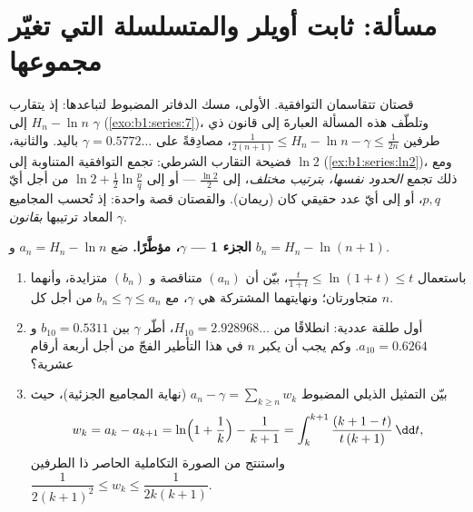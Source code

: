 \section{مسألة: ثابت أويلر والمتسلسلة التي تغيّر
مجموعها}

\begin{problem}[{مسألة نهاية الأسبوع --- $H_n = \ln n + \gamma +
\frac{1}{2n} + O(n^{-2})$، وإعادة ترتيب $1 - \frac12 +
\frac13 - \dots$ إلى $\frac{\ln 2}{2}$}]
\label{pb:b1:series:1}
قصتان تتقاسمان  التوافقية. الأولى، مسك الدفاتر
المضبوط لتباعدها: إذ يتقارب $H_n - \ln n$ إلى 
$\gamma$ (\cref{exo:b1:series:7})، وتلطّف هذه المسألة
العبارةَ إلى قانون ذي طرفين $\frac{1}{2(n+1)}
\leq H_n - \ln n - \gamma \leq \frac{1}{2n}$، مصادِقةً على $\gamma
= 0.5772\dots$ باليد. والثانية، فضيحة التقارب
الشرطي: تجمع  التوافقية المتناوبة إلى $\ln 2$
(\cref{ex:b1:series:ln2})، ومع ذلك تجمع \emph{الحدود نفسها، بترتيب
مختلف}، إلى $\frac{\ln 2}{2}$ --- أو إلى $\ln 2 +
\frac12\ln\frac pq$ من أجل أيّ $p, q$، أو إلى أيّ عدد حقيقي كان
(ريمان). والقصتان قصة واحدة: إذ تُحسب المجاميع المعاد ترتيبها
\emph{بقانون} $\gamma$.

\medskip
\noindent\textbf{الجزء 1 --- $\gamma$، مؤطَّرًا.} ضع $a_n = H_n
- \ln n$ و $b_n = H_n - \ln(n+1)$.
\begin{enumerate}
  \item باستعمال $\frac{t}{1+t} \leq \ln(1 + t) \leq t$، بيّن أن
        $(a_n)$ متناقصة و $(b_n)$ متزايدة، وأنهما
        متجاورتان؛ ونهايتهما المشتركة هي $\gamma$، مع $b_n \leq
        \gamma \leq a_n$ من أجل كل $n$.
  \item أول طلقة عددية: انطلاقًا من $H_{10} = 2.928968\dots$،
        أطّر $\gamma$ بين $b_{10} = 0.5311$ و $a_{10} =
        0.6264$. وكم يجب أن يكبر $n$ في هذا التأطير الفجّ
        من أجل أربعة أرقام عشرية؟
  \item بيّن التمثيل الذيلي المضبوط $a_n - \gamma =
        \sum_{k \geq n} w_k$ (نهاية المجاميع الجزئية)، حيث
        \[
        w_k = a_k - a_{k+1}
        = \ln\Bigl(1 + \frac1k\Bigr) - \frac{1}{k+1}
        = \int_k^{k+1} \frac{(k + 1 - t)}{t\,(k+1)}\,\dd t ,
        \]
        واستنتج من الصورة التكاملية الحاصر ذا الطرفين
        $\dfrac{1}{2(k+1)^2} \leq w_k \leq \dfrac{1}{2k(k+1)}$.
\end{enumerate}


\end{problem}
